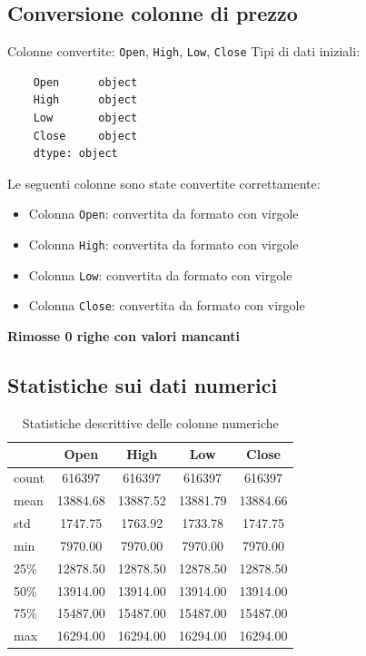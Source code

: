 \documentclass[%
	corpo=11pt,
    twoside,
    stile=classica,
    oldstyle,
    tipotesi=custom,
    greek,
    evenboxes,
]{toptesi}
\begin{document}
\subsection*{Conversione colonne di prezzo}

Colonne convertite: \texttt{Open}, \texttt{High}, \texttt{Low}, \texttt{Close}  
Tipi di dati iniziali:
\begin{verbatim}
	Open      object
	High      object
	Low       object
	Close     object
	dtype: object
\end{verbatim}

Le seguenti colonne sono state convertite correttamente:
\begin{itemize}
	\item Colonna \texttt{Open}: convertita da formato con virgole
	\item Colonna \texttt{High}: convertita da formato con virgole
	\item Colonna \texttt{Low}: convertita da formato con virgole
	\item Colonna \texttt{Close}: convertita da formato con virgole
\end{itemize}

\textbf{Rimosse 0 righe con valori mancanti}

\subsection*{Statistiche sui dati numerici}

\begin{table}[h]
	\centering
	\begin{tabular}{lcccc}
		\hline
		& Open & High & Low & Close \\
		\hline
		count & 616397 & 616397 & 616397 & 616397 \\
		mean  & 13884.68 & 13887.52 & 13881.79 & 13884.66 \\
		std   & 1747.75  & 1763.92  & 1733.78  & 1747.75 \\
		min   & 7970.00  & 7970.00  & 7970.00  & 7970.00 \\
		25\%  & 12878.50 & 12878.50 & 12878.50 & 12878.50 \\
		50\%  & 13914.00 & 13914.00 & 13914.00 & 13914.00 \\
		75\%  & 15487.00 & 15487.00 & 15487.00 & 15487.00 \\
		max   & 16294.00 & 16294.00 & 16294.00 & 16294.00 \\
		\hline
	\end{tabular}
	\caption{Statistiche descrittive delle colonne numeriche}
\end{table}
\end{document}
